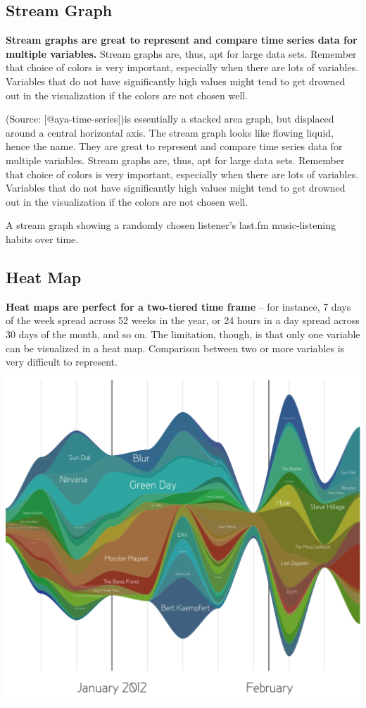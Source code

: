 \documentclass[]{book}
\theoremstyle{definition}
\theoremstyle{definition}
\theoremstyle{definition}
\theoremstyle{remark}
\begin{document}
\subsection{Stream Graph}\label{stream-graph}

\textbf{Stream graphs are great to represent and compare time series
data for multiple variables.} Stream graphs are, thus, apt for large
data sets. Remember that choice of colors is very important, especially
when there are lots of variables. Variables that do not have
significantly high values might tend to get drowned out in the
visualization if the colors are not chosen well.

(Source: {[}@aya-time-series{]})is essentially a stacked area graph, but
displaced around a central horizontal axis. The stream graph looks like
flowing liquid, hence the name. They are great to represent and compare
time series data for multiple variables. Stream graphs are, thus, apt
for large data sets. Remember that choice of colors is very important,
especially when there are lots of variables. Variables that do not have
significantly high values might tend to get drowned out in the
visualization if the colors are not chosen well.

A stream graph showing a randomly chosen listener's last.fm
music-listening habits over time.

\subsection{Heat Map}\label{heat-map}

\textbf{Heat maps are perfect for a two-tiered time frame} -- for
instance, 7 days of the week spread across 52 weeks in the year, or 24
hours in a day spread across 30 days of the month, and so on. The
limitation, though, is that only one variable can be visualized in a
heat map. Comparison between two or more variables is very difficult to
represent. \includegraphics{images/aya-stream.png}
\end{document}
